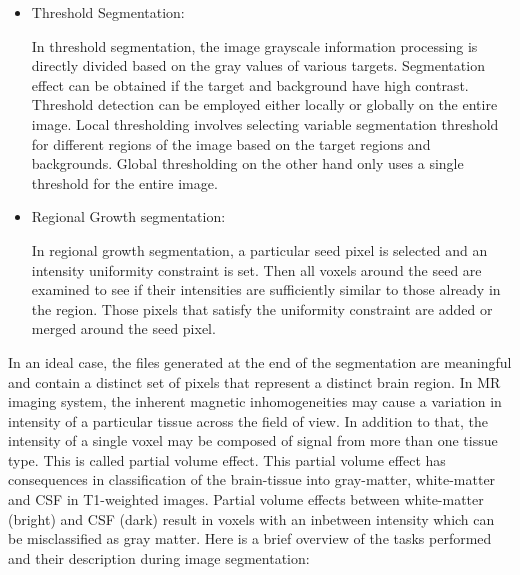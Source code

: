 \documentclass[12pt]{article}
\begin{document}
\begin{itemize}

   \item Threshold Segmentation:

    In threshold segmentation, the image grayscale information
    processing is directly divided based on the gray values of various
    targets. Segmentation effect can be obtained if the target and
    background have high contrast. Threshold detection can be employed
    either locally or globally on the entire image. Local thresholding
    involves selecting variable segmentation threshold for different
    regions of the image based on the target regions and backgrounds.
    Global thresholding on the other hand only uses a single threshold
    for the entire image.

    \item Regional Growth segmentation:

      In regional growth segmentation, a particular seed pixel is
      selected  and an intensity uniformity constraint is set. Then
      all voxels around the seed are examined to see if their
      intensities are sufficiently similar to those already in the
      region. Those pixels that satisfy the uniformity constraint are
      added or merged around the seed pixel.

\end{itemize}

In an ideal case, the files generated at the end of the segmentation
are meaningful and contain a distinct set of pixels that represent a
distinct brain region. In MR imaging system, the inherent magnetic
inhomogeneities may cause a variation in intensity of a particular
tissue across the field of view. In addition to that, the intensity of
a single voxel may be composed of signal from more than one tissue
type. This is called partial volume effect. This partial volume effect
has consequences in classification of the brain-tissue into
gray-matter, white-matter and CSF in T1-weighted images. Partial
volume effects between white-matter (bright) and CSF (dark) result in
voxels with an inbetween intensity which can be misclassified as gray
matter. Here is a brief overview of the tasks performed and their
description during image segmentation:
\end{document}
